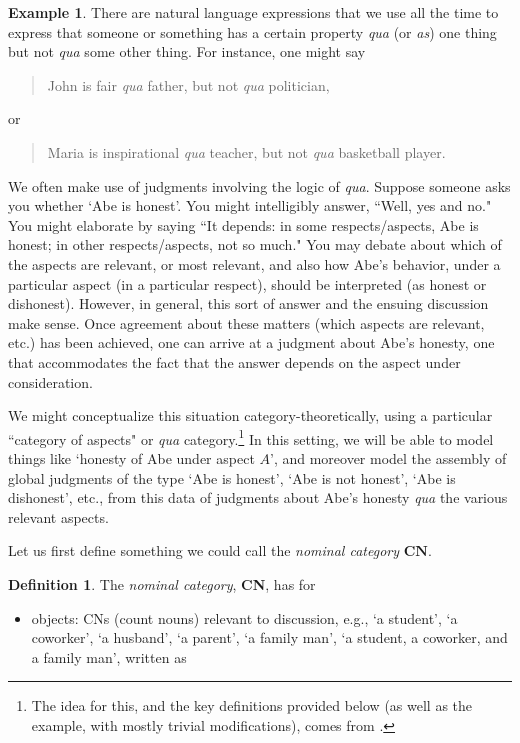 \documentclass[11pt]{book}
\theoremstyle{definition}
\newtheorem{example}{Example}[section]
\theoremstyle{definition}
\newtheorem{definition}{Definition}[section]
\theoremstyle{definition}
\theoremstyle{theorem}
\theoremstyle{definition}
\begin{document}
\begin{example} \label{qua}
	There are natural language expressions that we use all the time to express that someone or something has a certain property \textit{qua} (or \textit{as}) one thing but not \textit{qua} some other thing. For instance, one might say  
	\begin{quote}
		John is fair \textit{qua} father, but not \textit{qua} politician,  
	\end{quote}
or 
\begin{quote}
	Maria is inspirational \textit{qua} teacher, but not \textit{qua} basketball player.
\end{quote}
We often make use of judgments involving the logic of \textit{qua}. Suppose someone asks you whether `Abe is honest'. You might intelligibly answer, ``Well, yes and no." You might elaborate by saying ``It depends: in some respects/aspects, Abe is honest; in other respects/aspects, not so much." You may debate about which of the aspects are relevant, or most relevant, and also how Abe's behavior, under a particular aspect (in a particular respect), should be interpreted (as honest or dishonest). However, in general, this sort of answer and the ensuing discussion make sense. Once agreement about these matters (which aspects are relevant, etc.) has been achieved, one can arrive at a judgment about Abe's honesty, one that accommodates the fact that the answer depends on the aspect under consideration. \par 
	We might conceptualize this situation category-theoretically, using a particular  ``category of aspects" or \textit{qua} category.\footnote{The idea for this, and the key definitions provided below (as well as the example, with mostly trivial modifications), comes from \cite{la_palme_reyes_models_1999}.} In this setting, we will be able to model things like `honesty of Abe under aspect $A$', and moreover model the assembly of global judgments of the type `Abe is honest', `Abe is not honest', `Abe is dishonest', etc., from this data of judgments about Abe's honesty \textit{qua} the various relevant aspects. \par 
	Let us first define something we could call the \textit{nominal category} $\textbf{CN}$. 
	\begin{definition}
		The \textit{nominal category}, \textbf{CN}, has for
		\begin{itemize}
			\item objects: CNs (count nouns) relevant to discussion, e.g., `a student', `a coworker', `a husband', `a parent', `a family man', `a student, a coworker, and a family man', written as 

\end{itemize}
\end{definition}
\end{example}
\end{document}
